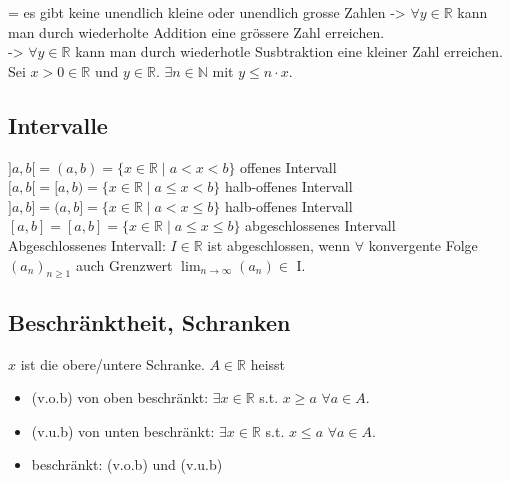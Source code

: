 \documentclass[a4paper]{article}
\def\limn{\lim_{n\to \infty}}
\newcommand\R{\ensuremath{\mathbb{R}}}
\begin{document}
  \tiny \color{gray}
    = es gibt keine unendlich kleine oder unendlich grosse Zahlen
    -> $\forall y \in \R$ kann man durch wiederholte Addition eine grössere Zahl erreichen. \\
    -> $\forall y \in \R$ kann man durch wiederhotle Susbtraktion eine kleiner Zahl erreichen. \\
  \color{black} \normalsize
  Sei $x > 0 \in \R$ und $y \in \R$. $\exists n \in \mathbb{N}$ mit $y \leqslant n \cdot x$. \\
  
  \subsection{Intervalle}
  $]a,b[ = (a,b) = \{x \in \R \; | \; a < x < b\}$ 
    \tiny \color{gray}
      offenes Intervall
    \normalsize \color{black} \\
  $[a,b[ = [a,b) = \{x \in \R \; | \; a \leqslant x < b\}$ 
    \tiny \color{gray}
      halb-offenes Intervall
    \normalsize \color{black} \\
  $]a,b] = (a,b] = \{x \in \R \; | \; a < x \leqslant b\}$ 
    \tiny \color{gray}
      halb-offenes Intervall
    \normalsize \color{black} \\
  $[a,b] = [a,b] = \{x \in \R \; | \; a \leqslant x \leqslant b\}$ 
    \tiny \color{gray}
      abgeschlossenes Intervall
    \normalsize \color{black} \\
  Abgeschlossenes Intervall: $I \in \R$ ist abgeschlossen, wenn $\forall$ konvergente Folge $(a_n)_{n \geqslant 1}$ auch Grenzwert $\limn (a_n) \in$ I. \\
  
  \subsection{Beschränktheit, Schranken}
  $x$ ist die obere/untere Schranke. $A \in \R$ heisst 
  \begin{itemize}[leftmargin=4.5mm, topsep=1pt, itemsep=1pt, parsep=1pt]
    \item (v.o.b) von oben beschränkt: $\exists x \in \R$ s.t. $x \geqslant a$ $\forall a \in A$. \\
    \item (v.u.b) von unten beschränkt: $\exists x \in \R$ s.t. $x \leqslant a$ $\forall a \in A$. \\
    \item beschränkt: (v.o.b) und (v.u.b) \\
  \end{itemize}
  
\end{document}
